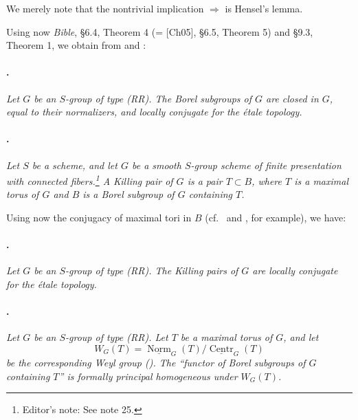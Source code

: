 We merely note that the nontrivial implication
\textup{}\(\Rightarrow\)\textup{} is Hensel's lemma.

Using now \textit{Bible}, \S6.4, Theorem 4
\textup{(= [Ch05], \S6.5, Theorem 5)} and \S9.3,
Theorem 1, we obtain from  and :

\paragraph{.}
\textit{Let \(G\) be an \(S\)-group of type \textup{(RR)}. The
Borel subgroups of \(G\) are closed in \(G\), equal to their
normalizers, and locally conjugate for the étale topology.}

\paragraph{.}
\textit{Let \(S\) be a scheme, and let \(G\) be a smooth
\(S\)-group scheme of finite presentation with connected
fibers.\footnote{Editor's note: See note 25.} A \emph{Killing pair}
of \(G\) is a pair \(T\subset B\), where \(T\) is a maximal torus
of \(G\) and \(B\) is a Borel subgroup of \(G\) containing \(T\).}

Using now the conjugacy of maximal tori in \(B\)
\textup{(cf.\  \textup{} and , for example)}, we have:

\paragraph{.}
\textit{Let \(G\) be an \(S\)-group of type \textup{(RR)}. The
Killing pairs of \(G\) are locally conjugate for the étale topology.}

\paragraph{.}
\textit{Let \(G\) be an \(S\)-group of type \textup{(RR)}. Let
\(T\) be a maximal torus of \(G\), and let}
\[
  W_G(T)
  =
  \underline{\operatorname{Norm}}_G(T)/
  \underline{\operatorname{Centr}}_G(T)
\]
\textit{be the corresponding Weyl group \textup{()}. The ``functor of Borel subgroups of \(G\) containing \(T\)''
is formally principal homogeneous under \(W_G(T)\).}

